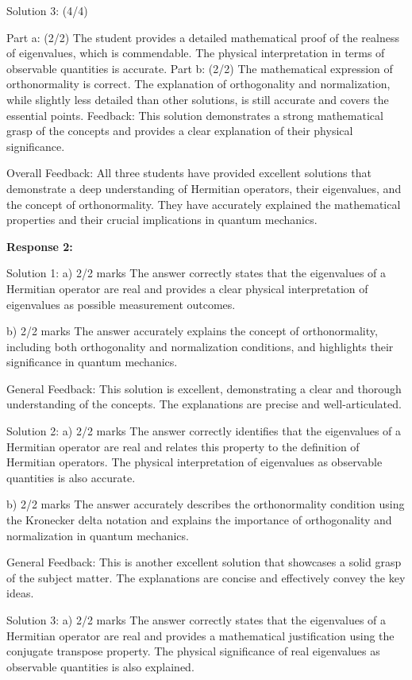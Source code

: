 \documentclass[a4paper,11pt]{article}
\begin{document}
Solution 3: (4/4)

Part a: (2/2) The student provides a detailed mathematical proof of the realness of eigenvalues, which is commendable. The physical interpretation in terms of observable quantities is accurate.
Part b: (2/2) The mathematical expression of orthonormality is correct. The explanation of orthogonality and normalization, while slightly less detailed than other solutions, is still accurate and covers the essential points.
Feedback: This solution demonstrates a strong mathematical grasp of the concepts and provides a clear explanation of their physical significance.

Overall Feedback: All three students have provided excellent solutions that demonstrate a deep understanding of Hermitian operators, their eigenvalues, and the concept of orthonormality. They have accurately explained the mathematical properties and their crucial implications in quantum mechanics.

\textbf{Response 2:}

Solution 1:
a) 2/2 marks
The answer correctly states that the eigenvalues of a Hermitian operator are real and provides a clear physical interpretation of eigenvalues as possible measurement outcomes.

b) 2/2 marks
The answer accurately explains the concept of orthonormality, including both orthogonality and normalization conditions, and highlights their significance in quantum mechanics.

General Feedback: This solution is excellent, demonstrating a clear and thorough understanding of the concepts. The explanations are precise and well-articulated.

Solution 2:
a) 2/2 marks
The answer correctly identifies that the eigenvalues of a Hermitian operator are real and relates this property to the definition of Hermitian operators. The physical interpretation of eigenvalues as observable quantities is also accurate.

b) 2/2 marks
The answer accurately describes the orthonormality condition using the Kronecker delta notation and explains the importance of orthogonality and normalization in quantum mechanics.

General Feedback: This is another excellent solution that showcases a solid grasp of the subject matter. The explanations are concise and effectively convey the key ideas.

Solution 3:
a) 2/2 marks
The answer correctly states that the eigenvalues of a Hermitian operator are real and provides a mathematical justification using the conjugate transpose property. The physical significance of real eigenvalues as observable quantities is also explained.
\end{document}
